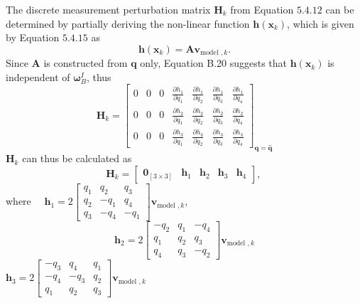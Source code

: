The discrete measurement perturbation matrix $\mathbf{H}_{k}$ from Equation $5.4 .12$ can be determined by partially deriving the non-linear function $\boldsymbol{h}\left(\mathbf{x}_{k}\right)$, which is given by Equation $5.4 .15$ as
$$
\boldsymbol{h}\left(\mathbf{x}_{k}\right)=\mathbf{A} \mathbf{v}_{\text {model }, k} .
$$
Since $\mathbf{A}$ is constructed from $\mathbf{q}$ only, Equation B.20 suggests that $\boldsymbol{h}\left(\mathbf{x}_{k}\right)$ is independent of $\boldsymbol{\omega}_{B}^{I}$, thus
$$
\mathbf{H}_{k}=\left[\begin{array}{lllllll}
0 & 0 & 0 & \frac{\partial h_{1}}{\partial q_{1}} & \frac{\partial h_{1}}{\partial q_{2}} & \frac{\partial h_{1}}{\partial q_{3}} & \frac{\partial h_{1}}{\partial q_{4}} \\
0 & 0 & 0 & \frac{\partial h_{2}}{\partial q_{1}} & \frac{\partial h_{2}}{\partial q_{2}} & \frac{\partial h_{2}}{\partial q_{3}} & \frac{\partial h_{2}}{\partial q_{4}} \\
0 & 0 & 0 & \frac{\partial h_{3}}{\partial q_{1}} & \frac{\partial h_{3}}{\partial q_{2}} & \frac{\partial h_{3}}{\partial q_{3}} & \frac{\partial h_{3}}{\partial q_{4}}
\end{array}\right]_{\mathbf{q}=\hat{\mathbf{q}}}
$$
$\mathbf{H}_{k}$ can thus be calculated as
$$
\mathbf{H}_{k}=\left[\begin{array}{lllll}
\mathbf{0}_{[3 \times 3]} & \mathbf{h}_{1} & \mathbf{h}_{2} & \mathbf{h}_{3} & \mathbf{h}_{4}
\end{array}\right] \text {, }
$$
where $\quad \mathbf{h}_{1}=2\left[\begin{array}{ccc}q_{1} & q_{2} & q_{3} \\ q_{2} & -q_{1} & q_{4} \\ q_{3} & -q_{4} & -q_{1}\end{array}\right] \mathbf{v}_{\text {model }, k}$,
$$
\mathbf{h}_{2}=2\left[\begin{array}{ccc}
-q_{2} & q_{1} & -q_{4} \\
q_{1} & q_{2} & q_{3} \\
q_{4} & q_{3} & -q_{2}
\end{array}\right] \mathbf{v}_{\text {model }, k}
$$
$\mathbf{h}_{3}=2\left[\begin{array}{ccc}-q_{3} & q_{4} & q_{1} \\ -q_{4} & -q_{3} & q_{2} \\ q_{1} & q_{2} & q_{3}\end{array}\right] \mathbf{v}_{\text {model }, k}$

